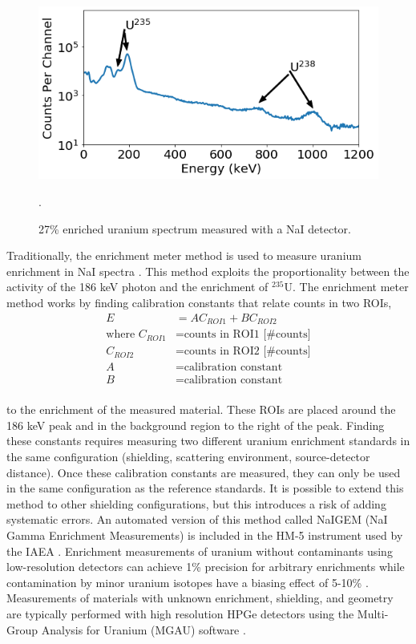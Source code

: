 \begin{figure}[H]
	\centering
	\includegraphics[width=0.8\linewidth]{images/enriched_u_peaks_displayed}
	\caption{27\% enriched uranium spectrum measured with a NaI detector.}.
	\label{fig:enriched_u_peaks_displayed}
\end{figure}

Traditionally, the enrichment meter method is used to measure uranium enrichment in NaI spectra \cite{Reilly1970}. This method exploits the proportionality between the activity of the 186 keV photon and the enrichment of $^{235}$U. The enrichment meter method works by finding calibration constants that relate counts in two ROIs,
%
\begin{align} \label{eq:enrichment_meter_principle}
E &= A  C_{ROI1} + B C_{ROI2} \nonumber \\
\text{where } C_{ROI1} &= \text{counts in ROI1 [\# counts]} \nonumber \\
C_{ROI2} &= \text{counts in ROI2 [\# counts]} \nonumber \\
A &= \text{calibration constant} \nonumber \\
B &= \text{calibration constant} \nonumber \\
\end{align}
%

to the enrichment of the measured material. These ROIs are placed around the 186 keV peak and in the background region to the right of the peak. Finding these constants requires measuring two different uranium enrichment standards in the same configuration (shielding, scattering environment, source-detector distance). Once these calibration constants are measured, they can only be used in the same configuration as the reference standards. It is possible to extend this method to other shielding configurations, but this introduces a risk of adding systematic errors. An automated version of this method called NaIGEM (NaI Gamma Enrichment Measurements) is included in the HM-5 instrument used by the IAEA \cite{MORTREAU2004}. Enrichment measurements of uranium without contaminants using low-resolution detectors can achieve 1\% precision for arbitrary enrichments while  contamination by minor uranium isotopes have a biasing effect of 5-10\% \cite{SPRINKLE1997}. Measurements of materials with unknown enrichment, shielding, and geometry are typically performed with high resolution HPGe detectors using the Multi-Group Analysis for Uranium (MGAU) software \cite{MGAU1994}.

